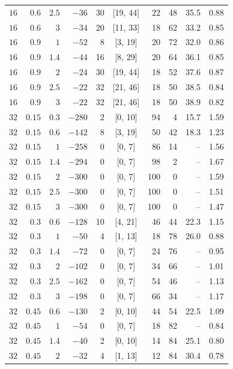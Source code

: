 \begin{table}[t]
\begin{tabular}{rrrrrcrrrr}
$16$ & $0.6$ & $2.5$ & $-36$ & 30 & [19, 44] & 22 & 48 & 35.5 & 0.88 \\
$16$ & $0.6$ & $3$ & $-34$ & 20 & [11, 33] & 18 & 62 & 33.2 & 0.85 \\
$16$ & $0.9$ & $1$ & $-52$ & 8 & [3, 19] & 20 & 72 & 32.0 & 0.86 \\
$16$ & $0.9$ & $1.4$ & $-44$ & 16 & [8, 29] & 20 & 64 & 36.1 & 0.85 \\
$16$ & $0.9$ & $2$ & $-24$ & 30 & [19, 44] & 18 & 52 & 37.6 & 0.87 \\
$16$ & $0.9$ & $2.5$ & $-22$ & 32 & [21, 46] & 18 & 50 & 38.5 & 0.84 \\
$16$ & $0.9$ & $3$ & $-22$ & 32 & [21, 46] & 18 & 50 & 38.9 & 0.82 \\
\midrule
$32$ & $0.15$ & $0.3$ & $-280$ & 2 & [0, 10] & 94 & 4 & 15.7 & 1.59 \\
$32$ & $0.15$ & $0.6$ & $-142$ & 8 & [3, 19] & 50 & 42 & 18.3 & 1.23 \\
$32$ & $0.15$ & $1$ & $-258$ & 0 & [0, 7] & 86 & 14 & -- & 1.56 \\
$32$ & $0.15$ & $1.4$ & $-294$ & 0 & [0, 7] & 98 & 2 & -- & 1.67 \\
$32$ & $0.15$ & $2$ & $-300$ & 0 & [0, 7] & 100 & 0 & -- & 1.59 \\
$32$ & $0.15$ & $2.5$ & $-300$ & 0 & [0, 7] & 100 & 0 & -- & 1.51 \\
$32$ & $0.15$ & $3$ & $-300$ & 0 & [0, 7] & 100 & 0 & -- & 1.47 \\
$32$ & $0.3$ & $0.6$ & $-128$ & 10 & [4, 21] & 46 & 44 & 22.3 & 1.15 \\
$32$ & $0.3$ & $1$ & $-50$ & 4 & [1, 13] & 18 & 78 & 26.0 & 0.88 \\
$32$ & $0.3$ & $1.4$ & $-72$ & 0 & [0, 7] & 24 & 76 & -- & 0.95 \\
$32$ & $0.3$ & $2$ & $-102$ & 0 & [0, 7] & 34 & 66 & -- & 1.01 \\
$32$ & $0.3$ & $2.5$ & $-162$ & 0 & [0, 7] & 54 & 46 & -- & 1.13 \\
$32$ & $0.3$ & $3$ & $-198$ & 0 & [0, 7] & 66 & 34 & -- & 1.17 \\
$32$ & $0.45$ & $0.6$ & $-130$ & 2 & [0, 10] & 44 & 54 & 22.5 & 1.09 \\
$32$ & $0.45$ & $1$ & $-54$ & 0 & [0, 7] & 18 & 82 & -- & 0.84 \\
$32$ & $0.45$ & $1.4$ & $-40$ & 2 & [0, 10] & 14 & 84 & 25.1 & 0.80 \\
$32$ & $0.45$ & $2$ & $-32$ & 4 & [1, 13] & 12 & 84 & 30.4 & 0.78 \\

\end{tabular}
\end{table}
